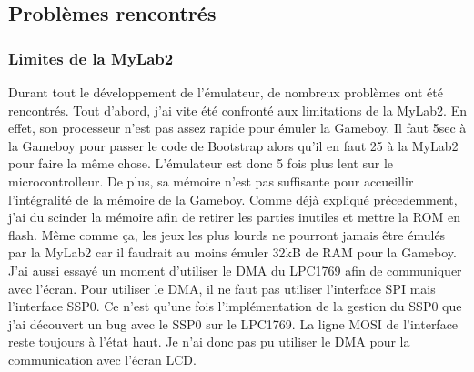 \documentclass[a4paper]{article}
\begin{document}
\subsection{Problèmes rencontrés}
\subsubsection{Limites de la MyLab2}
Durant tout le développement de l'émulateur, de nombreux problèmes ont été rencontrés.
Tout d'abord, j'ai vite été confronté aux limitations de la MyLab2. En effet,
son processeur n'est pas assez rapide pour émuler la Gameboy. Il faut 5sec à la
Gameboy pour passer le code de Bootstrap alors qu'il en faut 25 à la MyLab2 pour
faire la même chose. L'émulateur est donc 5 fois plus lent sur le microcontrolleur.
De plus, sa mémoire n'est pas suffisante pour accueillir l'intégralité de la mémoire
de la Gameboy. Comme déjà expliqué précedemment, j'ai du scinder la mémoire afin
de retirer les parties inutiles et mettre la ROM en flash. Même comme ça, les jeux
les plus lourds ne pourront jamais être émulés par la MyLab2 car il faudrait au moins
émuler 32kB de RAM pour la Gameboy. J'ai aussi essayé un moment d'utiliser le DMA
du LPC1769 afin de communiquer avec l'écran. Pour utiliser le DMA, il ne faut pas
utiliser l'interface SPI mais l'interface SSP0. Ce n'est qu'une fois l'implémentation
de la gestion du SSP0 que j'ai découvert un bug avec le SSP0 sur le LPC1769. La ligne
MOSI de l'interface reste toujours à l'état haut. Je n'ai donc pas pu utiliser le
DMA pour la communication avec l'écran LCD.
\end{document}
